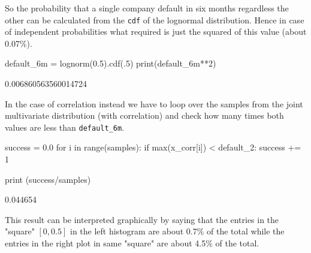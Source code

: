 \begin{solution}
So the probability that a single company default in six months regardless the other can be calculated from the \texttt{cdf} of the lognormal distribution.
Hence in case of independent probabilities what required is just the squared of this value (about 0.07\%).

\begin{ipython}
default_6m = lognorm(0.5).cdf(.5)
print(default_6m**2)
\end{ipython}
\begin{ioutput}
0.006860563560014724
\end{ioutput}

In the case of correlation instead we have to loop over the samples from the joint multivariate distribution (with correlation) and check how many times both values are less than \texttt{default\_6m}.

\begin{ipython}
success = 0.0
for i in range(samples):
    if max(x_corr[i]) < default_2:
        success += 1

print (success/samples)
\end{ipython}
\begin{ioutput}
0.044654
\end{ioutput}

This result can be interpreted graphically by saying that the entries in the "square" $[0, 0.5]$ in the left histogram are about 0.7\% of the total while the entries in the right plot in same "square" are about 4.5\% of the total. 
\end{solution}

